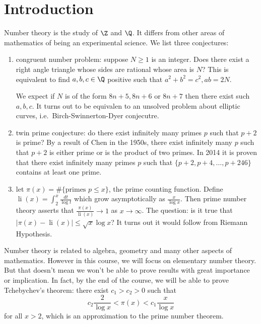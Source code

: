 \documentclass[a4paper]{article}
\DeclareMathOperator{\li}{li}
\begin{document}


\tableofcontents

\setcounter{section}{-1}

\section{Introduction}

Number theory is the study of \(\Z\) and \(\Q\). It differs from other areas of mathematics of being an experimental science. We list three conjectures:

\begin{enumerate}
\item congruent number problem: suppose \(N \geq 1\) is an integer. Does there exist a right angle triangle whose sides are rational whose area is \(N\)? This is equivalent to find \(a, b, c \in \Q\) positive such that \(a^2 + b^2 = c^2, ab = 2N\).

  We expect if \(N\) is of the form \(8n + 5, 8n + 6\) or \(8n + 7\) then there exist such \(a, b, c\). It turns out to be equivalen to an unsolved problem about elliptic curves, i.e.\ Birch-Swinnerton-Dyer conjecutre.
\item twin prime conjecture: do there exist infinitely many primes \(p\) such that \(p + 2\) is prime? By a result of Chen in the 1950s, there exist infinitely many \(p\) such that \(p + 2\) is either prime or is the product of two primes. In 2014 it is proven that there exist infinitely many primes \(p\) such that \(\{p + 2, p + 4, \dots, p + 246\}\) contains at least one prime.
\item let \(\pi(x) = \# \{\text{primes } p \leq x\}\), the prime counting function. Define \(\li (x) = \int_2^x \frac{dt}{\log t}\) which grow asymptotically as \(\frac{x}{\log x}\). Then prime number theory asserts that \(\frac{\pi(x)}{\li(x)} \to 1\) as \(x \to \infty\). The question: is it true that \(|\pi(x) - \li(x)| \leq \sqrt x \log x\)? It turns out it would follow from Riemann Hypothesis.
\end{enumerate}

Number theory is related to algebra, geometry and many other aspects of mathematics. However in this course, we will focus on elementary number theory. But that doesn't mean we won't be able to prove results with great importance or implication. In fact, by the end of the course, we will be able to prove Tchebychev's theorem: there exist \(c_1 > c_2 > 0\) such that
\[
  c_2 \frac{2}{\log x} < \pi(x) < c_1 \frac{x}{\log x}
\]
for all \(x > 2\), which is an approximation to the prime number theorem.
\end{document}
